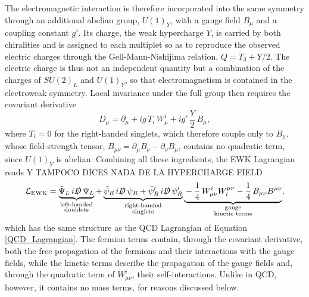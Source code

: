 The electromagnetic interaction is therefore incorporated into the same symmetry through an additional abelian group, $U(1)_Y$, with a gauge field $B_\mu$ and a coupling constant $g'$. Its charge, the weak hypercharge $Y$, is carried by both chiralities and is assigned to each multiplet so as to reproduce the observed electric charges through the Gell-Mann-Nishijima relation, $Q = T_3 + Y/2$. The electric charge is thus not an independent quantity but a combination of the charges of $SU(2)_L$ and $U(1)_Y$, so that electromagnetism is contained in the electroweak symmetry. Local invariance under the full group then requires the covariant derivative
\begin{equation}
    D_\mu = \partial_\mu + i g\, T_i\, W^i_\mu + i g'\, \frac{Y}{2}\, B_\mu,
    \label{eq:ew_covariant_derivative}
\end{equation}
%
where $T_i = 0$ for the right-handed singlets, which therefore couple only to $B_\mu$, whose field-strength tensor, $B_{\mu\nu} = \partial_\mu B_\nu - \partial_\nu B_\mu$, contains no quadratic term, since $U(1)_Y$ is abelian. Combining all these ingredients, the EWK Lagrangian reads Y TAMPOCO DICES NADA DE LA HYPERCHARGE FIELD
\begin{equation}
    \mathcal{L}_{\text{EWK}} =
    \underbrace{\bar{\Psi}_L\, i \slashed{D}\, \Psi_L}_{\substack{\text{left-handed}\\ \text{doublets}}}
    + \underbrace{\bar{\psi}_R\, i \slashed{D}\, \psi_R + \bar{\psi}'_R\, i \slashed{D}\, \psi'_R}_{\substack{\text{right-handed}\\ \text{singlets}}}
    \underbrace{{}- \frac{1}{4}\, W^i_{\mu\nu} W_i^{\mu\nu} - \frac{1}{4}\, B_{\mu\nu} B^{\mu\nu}}_{\substack{\text{gauge}\\ \text{kinetic terms}}},
    \label{EW_Lagrangian}
\end{equation}
%
which has the same structure as the QCD Lagrangian of Equation \ref{QCD_Lagrangian}. The fermion terms contain, through the covariant derivative, both the free propagation of the fermions and their interactions with the gauge fields, while the kinetic terms describe the propagation of the gauge fields and, through the quadratic term of $W^i_{\mu\nu}$, their self-interactions. Unlike in QCD, however, it contains no mass terms, for reasons discussed below.

